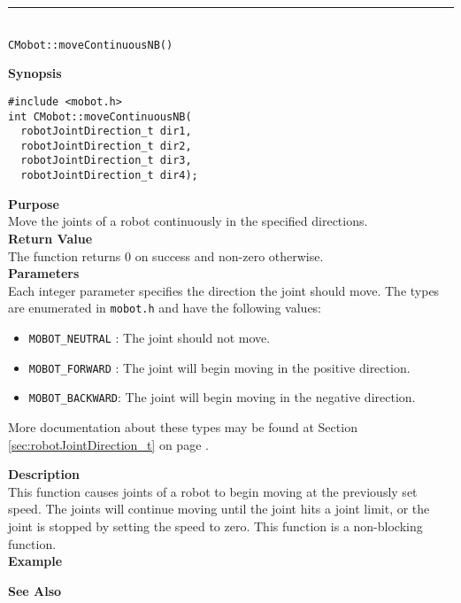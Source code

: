 \noindent
\vspace{5pt}
\rule{4.5in}{0.015in}\\
\noindent
{\LARGE \texttt{CMobot::moveContinuousNB()}}\\
{}

\noindent
{\bf Synopsis}\\
\begin{verbatim}
#include <mobot.h>
int CMobot::moveContinuousNB(
  robotJointDirection_t dir1, 
  robotJointDirection_t dir2, 
  robotJointDirection_t dir3, 
  robotJointDirection_t dir4);
\end{verbatim}

\noindent
{\bf Purpose}\\
Move the joints of a robot continuously in the specified directions.\\

\noindent
{\bf Return Value}\\
The function returns 0 on success and non-zero otherwise.\\

\noindent
{\bf Parameters}\\
Each integer parameter specifies the direction the joint should move. The types
are enumerated in \texttt{mobot.h} and have the following values:
\begin{itemize}
\item \texttt{MOBOT\_NEUTRAL} : The joint should not move.
\item \texttt{MOBOT\_FORWARD} : The joint will begin moving in the positive direction.
\item \texttt{MOBOT\_BACKWARD}: The joint will begin moving in the negative direction.
\end{itemize}
More documentation about these types may be found at Section
\ref{sec:robotJointDirection_t} on page
\pageref{sec:robotJointDirection_t}.

\noindent
{\bf Description}\\
This function causes joints of a robot to begin moving at the previously set
speed. The joints will continue moving until the joint hits a joint limit, or
the joint is stopped by setting the speed to zero. This function is a non-blocking
function.\\

\noindent
{\bf Example}\\
\noindent

\noindent
{\bf See Also}\\

